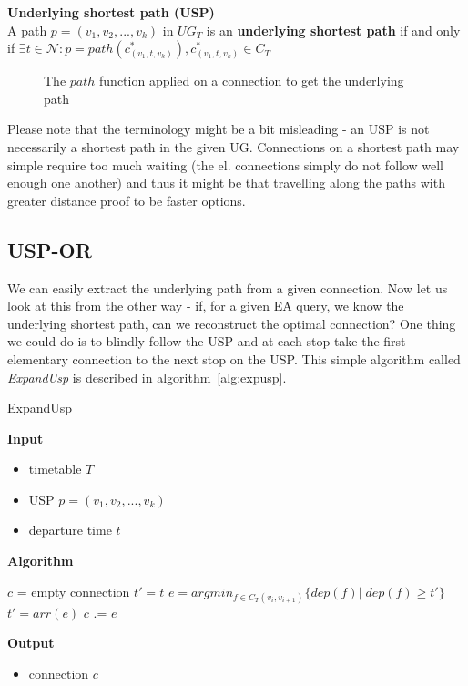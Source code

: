 	\begin{definition}
        \textbf{Underlying shortest path (USP)} \\
		A path $p = (v_{1}, v_{2}, ..., v_{k})$ in $UG_{T}$ is an \textbf{underlying shortest path} if and only if $\exists t \in \mathcal{N}: p = path(c_{(v_{1}, t, v_{k})}^{*}), c_{(v_{1}, t, v_{k})}^{*} \in C_{T}$
    \end{definition}
    
    \begin{figure}[h!]
		\begin{center}
		\end{center}
		\caption{\label{fig:pathfunc} The $path$ function applied on a connection to get the underlying path}
	\end{figure}
	
	\noindent Please note that the terminology might be a bit misleading - an USP is not necessarily a shortest path in the given UG. Connections on a shortest path may simple require too much waiting (the el. connections simply do not follow well enough one another) and thus it might be that travelling along the paths with greater distance proof to be faster options.
	    
\subsection{USP-OR}

	We can easily extract the underlying path from a given connection. Now let us look at this from the other way - if, for a given EA query, we know the underlying shortest path, can we reconstruct the optimal connection? One thing we could do is to blindly follow the USP and at each stop take the first elementary connection to the next stop on the USP. This simple algorithm called \textit{ExpandUsp} is described in algorithm~\ref{alg:expusp}. 
	
	\color{algcolor}
	\begin{algorithm}[H]
		\color{inalgcolor}
		\caption{ExpandUsp}
		\label{alg:expusp}
		\textbf{Input} 
		\begin{itemize}
			\item timetable $T$
			\item USP $p = (v_{1}, v_{2}, ..., v_{k})$
			\item departure time $t$
		\end{itemize}
		\textbf{Algorithm}
		\begin{algorithmic}
			\STATE $c$ = empty connection
			\STATE $t' = t$
				\STATE $e = argmin_{f \in C_{T}(v_{i}, v_{i + 1})} \{dep(f)|\; dep(f) \geq t'\}$ 
				\STATE $t' = arr(e)$
				\STATE $c$ .= $e$ 
			\ENDFOR
		\end{algorithmic}
		\textbf{Output}
		\begin{itemize}
			\item connection $c$
		\end{itemize}
	\end{algorithm}
	\color{black}	
	
